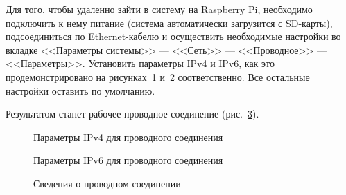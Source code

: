 Для того, чтобы удаленно зайти в систему на Raspberry Pi, необходимо подключить к нему питание (система автоматически загрузится с SD-карты), подсоединиться по Ethernet-кабелю и осуществить необходимые настройки во вкладке <<Параметры системы>> --- <<Сеть>> --- <<Проводное>> --- <<Параметры>>. Установить параметры IPv4 и IPv6, как это продемонстрировано на рисунках~\ref{network_1:network_1} и~\ref{network_2:network_2} соответственно. Все остальные настройки оставить по умолчанию.

Результатом станет рабочее проводное соединение (рис.~\ref{network_3:network_3}). 

\begin{figure}[h!]
\caption{ Параметры IPv4 для проводного соединения }
\label{network_1:network_1}
\end{figure}

\begin{figure}[h!]
\caption{ Параметры IPv6 для проводного соединения }
\label{network_2:network_2}
\end{figure}

\begin{figure}[h!]
\caption{ Сведения о проводном соединении }
\label{network_3:network_3}
\end{figure}

\clearpage




